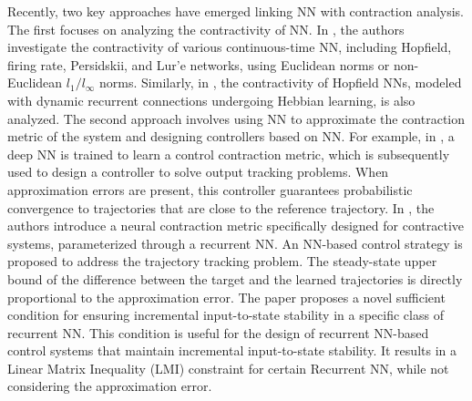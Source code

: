 \documentclass[journal,twoside,web]{ieeecolor}
\begin{document}
Recently, two key approaches have emerged linking NN with contraction analysis. The first focuses on analyzing the contractivity of NN. %
In \cite{centorrino2023euclidean,davydov2024non}, the authors investigate the contractivity of various continuous-time NN, including Hopfield, firing rate, Persidskii, and Lur'e networks, using Euclidean norms or non-Euclidean $l_1/l_\infty$ norms. Similarly, in \cite{centorrino2024modeling}, the contractivity of Hopfield NNs, modeled with dynamic recurrent connections undergoing Hebbian learning, is also analyzed. The second approach involves using NN to approximate the contraction metric of the system and designing controllers based on NN. For example, in \cite{sun2021learning}, a deep NN is trained to learn a control contraction metric, which is subsequently used to design a controller to solve output tracking problems. When approximation errors are present, this controller guarantees probabilistic convergence to trajectories that are close to the reference trajectory. In \cite{tsukamoto2021contraction}, the authors introduce a neural contraction metric specifically designed for contractive systems, parameterized through a recurrent NN. An NN-based control strategy is proposed to address the trajectory tracking problem. The steady-state upper bound of the difference between the target and the learned trajectories is directly proportional to the approximation error. The paper \cite{d2023incremental} proposes a novel sufficient condition for ensuring incremental input-to-state stability in a specific class of recurrent NN. This condition is useful for the design of recurrent NN-based control systems that maintain incremental input-to-state stability. It results in a Linear Matrix Inequality (LMI) constraint for certain Recurrent NN, while not considering the approximation error.
\end{document}
